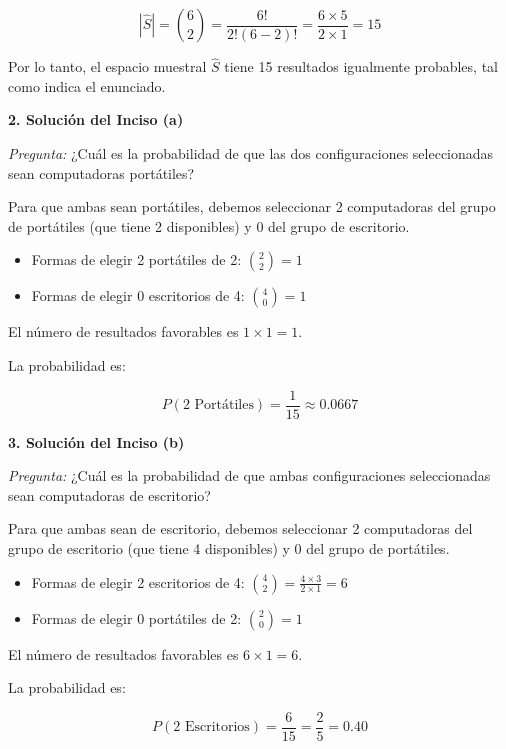 \documentclass[a4paper]{article}
\begin{document}
$$ |\hat{S}| = \binom{6}{2} = \frac{6!}{2!(6-2)!} = \frac{6 \times 5}{2 \times 1} = 15 $$

Por lo tanto, el espacio muestral $\hat{S}$ tiene 15 resultados igualmente probables, tal como indica el enunciado.

\vspace{0.3cm}

\textbf{2. Solución del Inciso (a)}

\textit{Pregunta:} ¿Cuál es la probabilidad de que las dos configuraciones seleccionadas sean computadoras portátiles?

Para que ambas sean portátiles, debemos seleccionar 2 computadoras del grupo de portátiles (que tiene 2 disponibles) y 0 del grupo de escritorio.

\begin{itemize}
    \item Formas de elegir 2 portátiles de 2: $\binom{2}{2} = 1$
    \item Formas de elegir 0 escritorios de 4: $\binom{4}{0} = 1$
\end{itemize}

El número de resultados favorables es $1 \times 1 = 1$.

La probabilidad es:

$$ P(\text{2 Portátiles}) = \frac{1}{15} \approx 0.0667 $$

\vspace{0.3cm}

\textbf{3. Solución del Inciso (b)}

\textit{Pregunta:} ¿Cuál es la probabilidad de que ambas configuraciones seleccionadas sean computadoras de escritorio?

Para que ambas sean de escritorio, debemos seleccionar 2 computadoras del grupo de escritorio (que tiene 4 disponibles) y 0 del grupo de portátiles.

\begin{itemize}
    \item Formas de elegir 2 escritorios de 4: $\binom{4}{2} = \frac{4 \times 3}{2 \times 1} = 6$
    \item Formas de elegir 0 portátiles de 2: $\binom{2}{0} = 1$
\end{itemize}

El número de resultados favorables es $6 \times 1 = 6$.

La probabilidad es:

$$ P(\text{2 Escritorios}) = \frac{6}{15} = \frac{2}{5} = 0.40 $$
\end{document}
